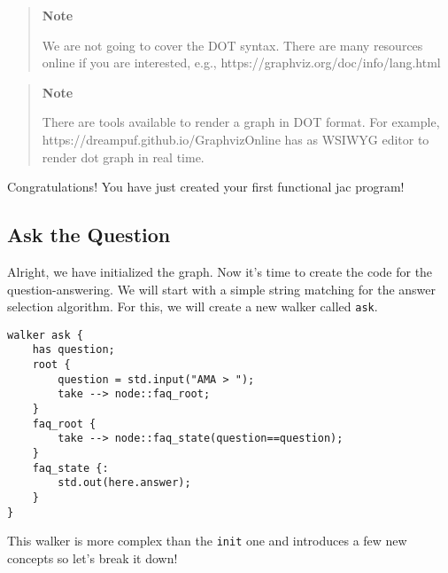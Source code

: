 \begin{quote}
    \textbf{Note}

    We are not going to cover the DOT syntax. There are many resources
    online if you are interested, e.g.,
    https://graphviz.org/doc/info/lang.html
\end{quote}

\begin{quote}
    \textbf{Note}

    There are tools available to render a graph in DOT format. For example,
    https://dreampuf.github.io/GraphvizOnline has as WSIWYG editor to render
    dot graph in real time.
\end{quote}

Congratulations! You have just created your first functional jac
program!

\subsection{Ask the Question}\label{ask-the-question}

Alright, we have initialized the graph. Now it's time to create the code
for the question-answering. We will start with a simple string matching
for the answer selection algorithm. For this, we will create a new
walker called \lstinline!ask!.

\begin{lstlisting}
walker ask {
    has question;
    root {
        question = std.input("AMA > ");
        take --> node::faq_root;
    }
    faq_root {
        take --> node::faq_state(question==question);
    }
    faq_state {:
        std.out(here.answer);
    }
}
\end{lstlisting}

This walker is more complex than the \lstinline!init! one and introduces
a few new concepts so let's break it down!


